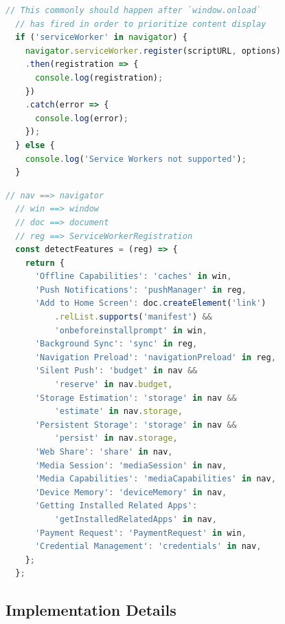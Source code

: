\documentclass[sigconf]{acmart}
\begin{document}
\begin{lstlisting}[caption={Checking for Service Worker support.},
  label=code:sw-supported, language=JavaScript, float=t] 
  // This commonly should happen after `window.onload`
  // has fired in order to prioritize content display
  if ('serviceWorker' in navigator) { 
    navigator.serviceWorker.register(scriptURL, options)
    .then(registration => {
      console.log(registration);
    })
    .catch(error => {
      console.log(error);
    });
  } else {
    console.log('Service Workers not supported');
  }
\end{lstlisting}

\begin{lstlisting}[caption={Feature detection of various \textsc{pwa} features.},
  label=code:feature-detection, language=JavaScript, float=t] 
  // nav ==> navigator
  // win ==> window
  // doc ==> document
  // reg ==> ServiceWorkerRegistration
  const detectFeatures = (reg) => {
    return {
      'Offline Capabilities': 'caches' in win,
      'Push Notifications': 'pushManager' in reg,
      'Add to Home Screen': doc.createElement('link')
          .relList.supports('manifest') &&
          'onbeforeinstallprompt' in win,
      'Background Sync': 'sync' in reg,
      'Navigation Preload': 'navigationPreload' in reg,
      'Silent Push': 'budget' in nav &&
          'reserve' in nav.budget,
      'Storage Estimation': 'storage' in nav &&
          'estimate' in nav.storage,
      'Persistent Storage': 'storage' in nav &&
          'persist' in nav.storage,
      'Web Share': 'share' in nav,
      'Media Session': 'mediaSession' in nav,
      'Media Capabilities': 'mediaCapabilities' in nav,
      'Device Memory': 'deviceMemory' in nav,
      'Getting Installed Related Apps':
          'getInstalledRelatedApps' in nav,
      'Payment Request': 'PaymentRequest' in win,
      'Credential Management': 'credentials' in nav,
    };
  };    
\end{lstlisting}  

\subsection{Implementation Details}
\end{document}
